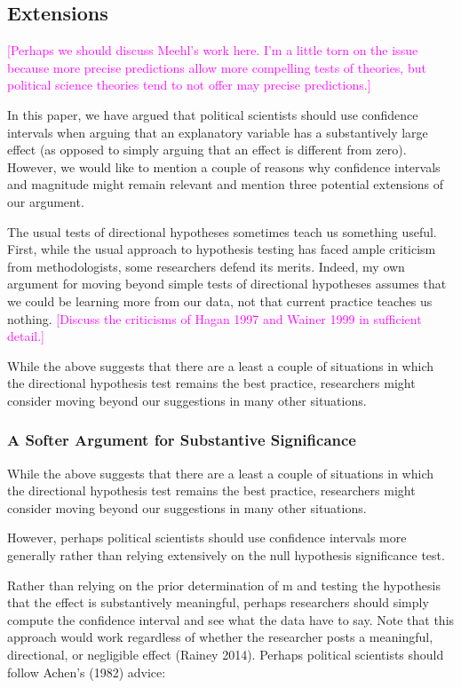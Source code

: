 \documentclass[12pt]{article}
\newcommand{\carlisle}[1]{\textcolor{magenta}{#1}}
\begin{document}
\subsection*{Extensions}

\carlisle{[Perhaps we should discuss Meehl's work here. I'm a little torn on the issue because more precise predictions allow more compelling tests of theories, but political science theories tend to not offer may precise predictions.]}

In this paper, we have argued that political scientists should use confidence intervals when arguing that an explanatory variable has a substantively large effect (as opposed to simply arguing that an effect is different from zero). However, we would like to mention a couple of reasons why confidence intervals and magnitude might remain relevant and mention three potential extensions of our argument.

The usual tests of directional hypotheses sometimes teach us something useful. First, while the usual approach to hypothesis testing has faced ample criticism from methodologists, some researchers defend its merits. Indeed, my own argument for moving beyond simple tests of directional hypotheses assumes that we could be learning more from our data, not that current practice teaches us nothing. \carlisle{[Discuss the criticisms of Hagan 1997 and Wainer 1999 in sufficient detail.]}


While the above suggests that there are a least a couple of situations in which the directional hypothesis test remains the best practice, researchers might consider moving beyond our suggestions in many other situations. 

\subsubsection*{A Softer Argument for Substantive Significance}

While the above suggests that there are a least a couple of situations in which the directional hypothesis test remains the best practice, researchers might consider moving beyond our suggestions in many other situations. 

However, perhaps political scientists should use confidence intervals more generally rather than relying extensively on the null hypothesis significance test.

Rather than relying on the prior determination of m and testing the hypothesis that the effect is substantively meaningful, perhaps researchers should simply compute the confidence interval and see what the data have to say. Note that this approach would work regardless of whether the researcher posts a meaningful, directional, or negligible effect (Rainey 2014). Perhaps political scientists should follow Achen's (1982) advice:
\end{document}
